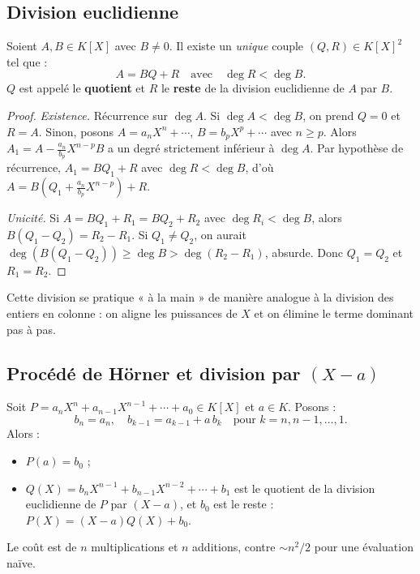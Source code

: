 \subsection{Division euclidienne}

\begin{theoreme}
Soient $A, B \in K[X]$ avec $B \neq 0$. Il existe un \emph{unique} couple $(Q, R) \in K[X]^2$ tel que :
\[ A = B Q + R \quad \text{avec} \quad \deg R < \deg B. \]
$Q$ est appelé le \textbf{quotient} et $R$ le \textbf{reste} de la division euclidienne de $A$ par $B$.
\end{theoreme}

\begin{proof}
\emph{Existence.} Récurrence sur $\deg A$. Si $\deg A < \deg B$, on prend $Q = 0$ et $R = A$. Sinon, posons $A = a_n X^n + \cdots$, $B = b_p X^p + \cdots$ avec $n \ge p$. Alors $A_1 = A - \frac{a_n}{b_p} X^{n-p} B$ a un degré strictement inférieur à $\deg A$. Par hypothèse de récurrence, $A_1 = B Q_1 + R$ avec $\deg R < \deg B$, d'où $A = B (Q_1 + \frac{a_n}{b_p} X^{n-p}) + R$.

\emph{Unicité.} Si $A = BQ_1 + R_1 = BQ_2 + R_2$ avec $\deg R_i < \deg B$, alors $B(Q_1 - Q_2) = R_2 - R_1$. Si $Q_1 \neq Q_2$, on aurait $\deg(B(Q_1 - Q_2)) \ge \deg B > \deg(R_2 - R_1)$, absurde. Donc $Q_1 = Q_2$ et $R_1 = R_2$.
\end{proof}

\begin{remarque}
Cette division se pratique « à la main » de manière analogue à la division des entiers en colonne : on aligne les puissances de $X$ et on élimine le terme dominant pas à pas.
\end{remarque}

\subsection{Procédé de Hörner et division par $(X - a)$}

\begin{proposition}
Soit $P = a_n X^n + a_{n-1} X^{n-1} + \cdots + a_0 \in K[X]$ et $a \in K$. Posons :
\[ b_n = a_n, \quad b_{k-1} = a_{k-1} + a\, b_k \quad \text{pour } k = n, n-1, \dots, 1. \]
Alors :
\begin{itemize}
    \item $P(a) = b_0$ ;
    \item $Q(X) = b_n X^{n-1} + b_{n-1} X^{n-2} + \cdots + b_1$ est le quotient de la division euclidienne de $P$ par $(X - a)$, et $b_0$ est le reste : $P(X) = (X - a) Q(X) + b_0$.
\end{itemize}
Le coût est de $n$ multiplications et $n$ additions, contre $\sim n^2 / 2$ pour une évaluation naïve.
\end{proposition}

